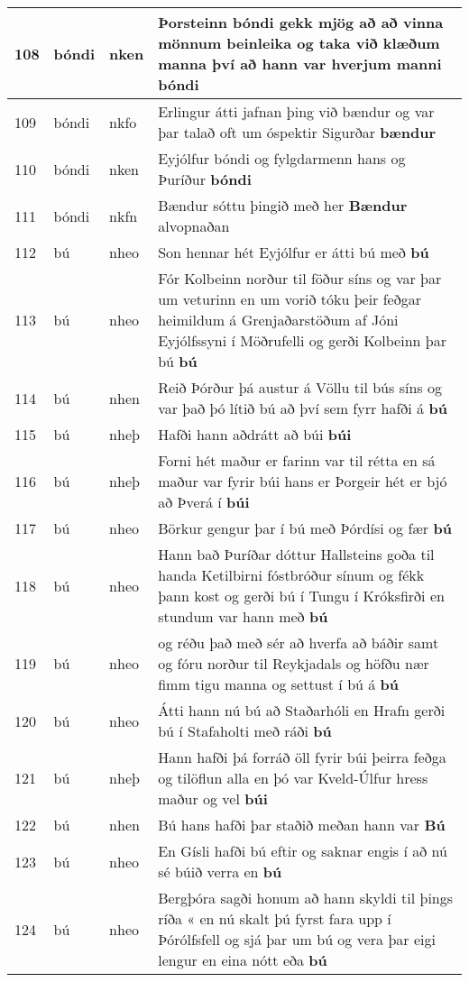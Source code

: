\documentclass{article}
\begin{document}
\begin{longtable}{p{1cm}|p{1cm}|p{1cm}|p{13cm}}
\hline
108&bóndi&nken&Þorsteinn bóndi gekk mjög að að vinna mönnum beinleika og taka við klæðum manna því að hann var hverjum manni \textbf{bóndi} \\
\hline
109&bóndi&nkfo&Erlingur átti jafnan þing við bændur og var þar talað oft um óspektir Sigurðar \textbf{bændur} \\
\hline
110&bóndi&nken&Eyjólfur bóndi og fylgdarmenn hans og Þuríður \textbf{bóndi} \\
\hline
111&bóndi&nkfn&Bændur sóttu þingið með her \textbf{Bændur} alvopnaðan\\
\hline
112&bú&nheo&Son hennar hét Eyjólfur er átti bú með \textbf{bú} \\
\hline
113&bú&nheo&Fór Kolbeinn norður til föður síns og var þar um veturinn en um vorið tóku þeir feðgar heimildum á Grenjaðarstöðum af Jóni Eyjólfssyni í Möðrufelli og gerði Kolbeinn þar bú \textbf{bú} \\
\hline
114&bú&nhen&Reið Þórður þá austur á Völlu til bús síns og var það þó lítið bú að því sem fyrr hafði á \textbf{bú} \\
\hline
115&bú&nheþ&Hafði hann aðdrátt að búi \textbf{búi} \\
\hline
116&bú&nheþ&Forni hét maður er farinn var til rétta en sá maður var fyrir búi hans er Þorgeir hét er bjó að Þverá í \textbf{búi} \\
\hline
117&bú&nheo&Börkur gengur þar í bú með Þórdísi og fær \textbf{bú} \\
\hline
118&bú&nheo&Hann bað Þuríðar dóttur Hallsteins goða til handa Ketilbirni fóstbróður sínum og fékk þann kost og gerði bú í Tungu í Króksfirði en stundum var hann með \textbf{bú} \\
\hline
119&bú&nheo&og réðu það með sér að hverfa að báðir samt og fóru norður til Reykjadals og höfðu nær fimm tigu manna og settust í bú á \textbf{bú} \\
\hline
120&bú&nheo&Átti hann nú bú að Staðarhóli en Hrafn gerði bú í Stafaholti með ráði \textbf{bú} \\
\hline
121&bú&nheþ&Hann hafði þá forráð öll fyrir búi þeirra feðga og tilöflun alla en þó var Kveld-Úlfur hress maður og vel \textbf{búi} \\
\hline
122&bú&nhen&Bú hans hafði þar staðið meðan hann var \textbf{Bú} \\
\hline
123&bú&nheo&En Gísli hafði bú eftir og saknar engis í að nú sé búið verra en \textbf{bú} \\
\hline
124&bú&nheo&Bergþóra sagði honum að hann skyldi til þings ríða « en nú skalt þú fyrst fara upp í Þórólfsfell og sjá þar um bú og vera þar eigi lengur en eina nótt eða \textbf{bú} \\

\end{longtable}
\end{document}
